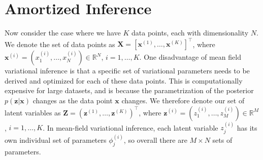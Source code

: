 \documentclass[honours,12pt, twoside]{unswthesis}
\newcommand{\R}{\mathbb{R}}
\numberwithin{equation}{section}
\theoremstyle{definition}
\begin{document}
\section{Amortized Inference}
Now consider the case where we have $K$ data points, each with dimensionality $N$. We denote the set of data points as $\bm{X}=\left[\bm{x}^{(1)},\dots,\bm{x}^{(K)}\right]^\top$, where $\bm{x}^{(i)}=(x^{(i)}_1,\dots,x^{(i)}_N)\in \R^N$, $i=1,\dots,K$. One disadvantage of mean field variational inference is that a specific set of variational parameters needs to be derived and optimized for each of these data points. This is computationally expensive for large datasets, and is because the parametrization of the posterior $p(\bm{z}|\bm{x})$ changes as the data point $\bm{x}$ changes. We therefore denote our set of latent variables as $\bm{Z}=(\bm{z}^{(1)},\dots,\bm{z}^{(K)})^\top$, where $\bm{z}^{(i)}=(z^{(i)}_1,\dots,z^{(i)}_M)\in \R^M$, $i=1,\dots,K$. In mean-field variational inference, each latent variable $z_j^{(i)}$ has its own individual set of parameters $\phi_j^{(i)}$, so overall there are $M\times N$ sets of parameters.
\end{document}
